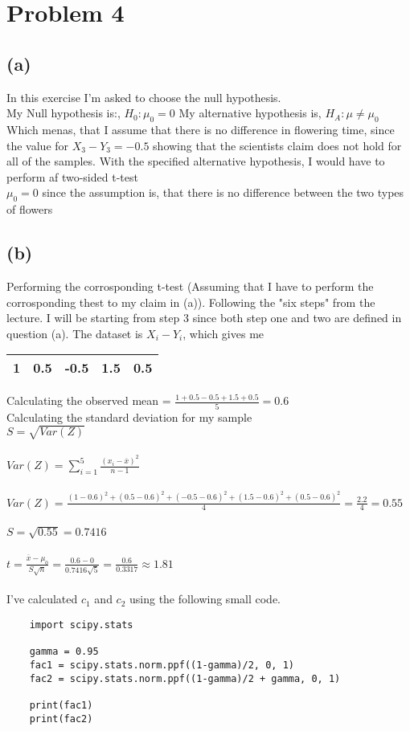 \section{Problem 4}
\subsection{(a)}
In this exercise I'm asked to choose the null hypothesis.
\\
My Null hypothesis is:, $ H_0 : \mu_0 = 0 $
My alternative hypothesis is, $H_A : \mu \neq \mu_0$
\\
Which menas, that I assume that there is no difference in flowering time, since the value for $X_3 - Y_3 = -0.5$ showing that
the scientists claim does not hold for all of the samples. With the specified
alternative hypothesis, I would have to perform af two-sided t-test
\\
$ \mu_0 = 0 $ since the assumption is, that there is no difference between the two types of flowers

\subsection{(b)}
Performing the corrosponding t-test (Assuming that I have to perform the corrosponding thest to my claim in (a)).
Following the "six steps" from the lecture. I will be starting from step 3 since both step one and two are defined in question (a).
The dataset is $ X_i - Y_i $, which gives me
\begin{center}
    \begin{tabular}{ |c|c|c|c|c| } 
     \hline
      1 & 0.5 & -0.5 & 1.5 & 0.5\\ 
     \hline
    \end{tabular}
    \end{center}


\noindent Calculating the observed mean = $ \frac{1 + 0.5 - 0.5 + 1.5 + 0.5}{5} = 0.6 $
\\
Calculating the standard deviation for my sample \\
$ S = \sqrt{Var(Z)}$ \\
\\
$ Var(Z) = \sum_{i=1}^{5} \frac{(x_i - \overline{x})^2}{n-1} $ \\
\\
$ Var(Z) = \frac{(1 - 0.6)^2 + (0.5 - 0.6)^2 + (-0.5 - 0.6)^2 + (1.5 - 0.6)^2 + (0.5 - 0.6)^2}{4} = \frac{2.2}{4} = 0.55 $  
\\
\\
$ S = \sqrt{0.55} = 0.7416$
\\
\\
$t = \frac{\overline{x} - \mu_0}{S \sqrt{n}} = \frac{0.6 - 0}{0.7416 \sqrt{5}} = \frac{0.6}{0.3317} \approx 1.81 $
\\
\\
I've calculated $c_{1}$ and $c_{2}$ using the following small code.

\begin{verbatim}
    import scipy.stats

    gamma = 0.95
    fac1 = scipy.stats.norm.ppf((1-gamma)/2, 0, 1)  
    fac2 = scipy.stats.norm.ppf((1-gamma)/2 + gamma, 0, 1)

    print(fac1)
    print(fac2)
\end{verbatim}